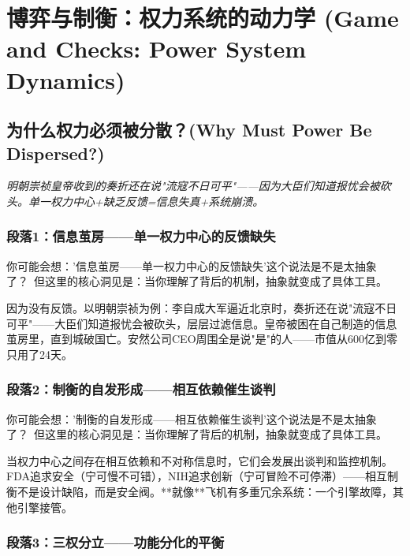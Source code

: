 \documentclass[a4paper,12pt]{book}
\newenvironment{motivation}{\begin{tcolorbox}[colback=gray!10,colframe=gray!60,title=\textit{动机}]\small\itshape}{\end{tcolorbox}}
\begin{document}
\begin{motivation}
\begin{motivation}
\begin{motivation}
	\section{博弈与制衡：权力系统的动力学 (Game and Checks: Power System Dynamics)}

	\subsection{为什么权力必须被分散？(Why Must Power Be Dispersed?)}
	\begin{motivation}
		明朝崇祯皇帝收到的奏折还在说"流寇不日可平"——因为大臣们知道报忧会被砍头。单一权力中心+缺乏反馈=信息失真+系统崩溃。
	\end{motivation}

	\subsubsection*{段落1：信息茧房——单一权力中心的反馈缺失}

	\begin{tcolorbox}[colback=yellow!5, title=\textit{读者行为预测}]
		你可能会想：'信息茧房——单一权力中心的反馈缺失'这个说法是不是太抽象了？\ 但这里的核心洞见是：当你理解了背后的机制，抽象就变成了具体工具。
	\end{tcolorbox}

因为没有反馈。以明朝崇祯为例：李自成大军逼近北京时，奏折还在说"流寇不日可平"——大臣们知道报忧会被砍头，层层过滤信息。皇帝被困在自己制造的信息茧房里，直到城破国亡。安然公司CEO周围全是说"是"的人——市值从600亿到零只用了24天。

	\subsubsection*{段落2：制衡的自发形成——相互依赖催生谈判}

	\begin{tcolorbox}[colback=yellow!5, title=\textit{读者行为预测}]
		你可能会想：'制衡的自发形成——相互依赖催生谈判'这个说法是不是太抽象了？\ 但这里的核心洞见是：当你理解了背后的机制，抽象就变成了具体工具。
	\end{tcolorbox}

当权力中心之间存在相互依赖和不对称信息时，它们会发展出谈判和监控机制。FDA追求安全（宁可慢不可错），NIH追求创新（宁可冒险不可停滞）——相互制衡不是设计缺陷，而是安全阀。**就像**飞机有多重冗余系统：一个引擎故障，其他引擎接管。

	\subsubsection*{段落3：三权分立——功能分化的平衡}


\end{motivation}
\end{motivation}
\end{motivation}
\end{document}
